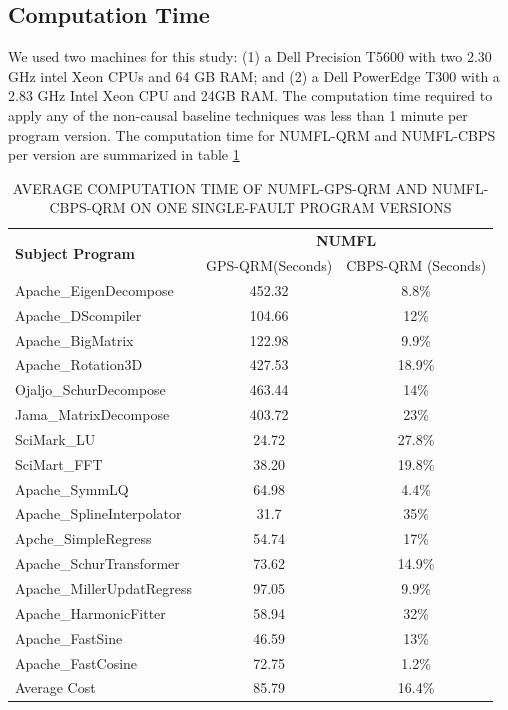 \subsection{Computation Time}
We used two machines for this study: (1) a Dell Precision T5600 with two 2.30 GHz intel Xeon CPUs and 64 GB RAM; and (2) a Dell PowerEdge T300 with a 2.83 GHz Intel Xeon CPU and 24GB RAM. The computation time required to apply any of the non-causal baseline techniques was less than 1 minute per program version. The computation time for NUMFL-QRM and NUMFL-CBPS per version are summarized in table \ref{computetime}

\begin{table}[htbp!]
\caption{AVERAGE COMPUTATION TIME OF NUMFL-GPS-QRM AND NUMFL-CBPS-QRM ON ONE SINGLE-FAULT PROGRAM VERSIONS }
\label{computetime}
\centering
      \begin{tabular}{|l|c|c|}
      \hline
\multirow{2}{*}{{\bf Subject Program}}	&	\multicolumn{2}{|c|}{{\bf NUMFL}}	\\	\cline{2-3}
  &  GPS-QRM(Seconds) &CBPS-QRM (Seconds)\\ \hline
Apache\_EigenDecompose	&	452.32	&	8.8\%	\\	\hline
Apache\_DScompiler	&	104.66	&	12\%	\\	\hline
Apache\_BigMatrix	&	122.98	&	9.9\%	\\	\hline
Apache\_Rotation3D	&	427.53	&	18.9\%	\\	\hline
Ojaljo\_SchurDecompose	&	463.44	&	14\%	\\	\hline
Jama\_MatrixDecompose	&	403.72	&	23\%	\\	\hline
SciMark\_LU	&	24.72	&	27.8\%	\\	\hline
SciMart\_FFT	&	38.20	&	19.8\%	\\	\hline
Apache\_SymmLQ	&	64.98	&	4.4\%	\\	\hline
Apache\_SplineInterpolator	&	31.7	&	35\%	\\	\hline
Apche\_SimpleRegress	&	54.74	&	17\%	\\	\hline
Apache\_SchurTransformer	&	73.62	&	14.9\%	\\	\hline
Apache\_MillerUpdatRegress	&	97.05	&	9.9\%	\\	\hline
Apache\_HarmonicFitter	&	58.94	&	32\%	\\	\hline
Apache\_FastSine	&	46.59	&	13\%	\\	\hline
Apache\_FastCosine	&	72.75	&	1.2\%	\\	\hline
Average Cost	&	85.79	&	16.4\%	\\	\hline
\end{tabular}
\end{table}

